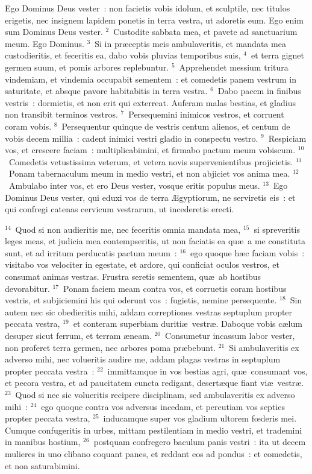 \lettrine[lines=3,image=true,loversize=0.05,lraise=-0.03]{E}{}go Dominus Deus vester~: non facietis vobis idolum, et sculptile, nec titulos erigetis, nec insignem lapidem ponetis in terra vestra, ut adoretis eum. Ego enim sum Dominus Deus vester.
${}^{2}$~Custodite sabbata mea, et pavete ad sanctuarium meum. Ego Dominus.
${}^{3}$~Si in pr\ae ceptis meis ambulaveritis, et mandata mea custodieritis, et feceritis ea, dabo vobis pluvias temporibus suis,
${}^{4}$~et terra gignet germen suum, et pomis arbores replebuntur.
${}^{5}$~Apprehendet messium tritura vindemiam, et vindemia occupabit sementem~: et comedetis panem vestrum in saturitate, et absque pavore habitabitis in terra vestra.
${}^{6}$~Dabo pacem in finibus vestris~: dormietis, et non erit qui exterreat. Auferam malas bestias, et gladius non transibit terminos vestros.
${}^{7}$~Persequemini inimicos vestros, et corruent coram vobis.
${}^{8}$~Persequentur quinque de vestris centum alienos, et centum de vobis decem millia~: cadent inimici vestri gladio in conspectu vestro.
${}^{9}$~Respiciam vos, et crescere faciam~: multiplicabimini, et firmabo pactum meum vobiscum.
${}^{10}$~Comedetis vetustissima veterum, et vetera novis supervenientibus projicietis.
${}^{11}$~Ponam tabernaculum meum in medio vestri, et non abjiciet vos anima mea.
${}^{12}$~Ambulabo inter vos, et ero Deus vester, vosque eritis populus meus.
${}^{13}$~Ego Dominus Deus vester, qui eduxi vos de terra \AE gyptiorum, ne serviretis eis~: et qui confregi catenas cervicum vestrarum, ut incederetis erecti.


${}^{14}$~Quod si non audieritis me, nec feceritis omnia mandata mea,
${}^{15}$~si spreveritis leges meas, et judicia mea contempseritis, ut non faciatis ea qu\ae\ a me constituta sunt, et ad irritum perducatis pactum meum~:
${}^{16}$~ego quoque h\ae c faciam vobis~: visitabo vos velociter in egestate, et ardore, qui conficiat oculos vestros, et consumat animas vestras. Frustra seretis sementem, qu\ae\ ab hostibus devorabitur.
${}^{17}$~Ponam faciem meam contra vos, et corruetis coram hostibus vestris, et subjiciemini his qui oderunt vos~: fugietis, nemine persequente.
${}^{18}$~Sin autem nec sic obedieritis mihi, addam correptiones vestras septuplum propter peccata vestra,
${}^{19}$~et conteram superbiam duriti\ae\ vestr\ae . Daboque vobis c\ae lum desuper sicut ferrum, et terram \ae neam.
${}^{20}$~Consumetur incassum labor vester, non proferet terra germen, nec arbores poma pr\ae bebunt.
${}^{21}$~Si ambulaveritis ex adverso mihi, nec volueritis audire me, addam plagas vestras in septuplum propter peccata vestra~:
${}^{22}$~immittamque in vos bestias agri, qu\ae\ consumant vos, et pecora vestra, et ad paucitatem cuncta redigant, desert\ae que fiant vi\ae\ vestr\ae .
${}^{23}$~Quod si nec sic volueritis recipere disciplinam, sed ambulaveritis ex adverso mihi~:
${}^{24}$~ego quoque contra vos adversus incedam, et percutiam vos septies propter peccata vestra,
${}^{25}$~inducamque super vos gladium ultorem fœderis mei. Cumque confugeritis in urbes, mittam pestilentiam in medio vestri, et trademini in manibus hostium,
${}^{26}$~postquam confregero baculum panis vestri~: ita ut decem mulieres in uno clibano coquant panes, et reddant eos ad pondus~: et comedetis, et non saturabimini.


